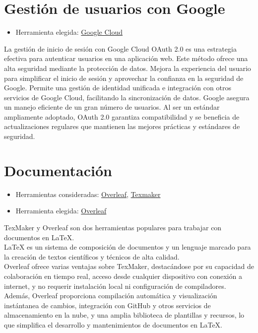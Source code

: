 \section{Gestión de usuarios con Google}
\begin{itemize}
    \item Herramienta elegida: \href{https://cloud.google.com/?_gl=1*1ffy0bq*_up*MQ..&gclid=CjwKCAjwupGyBhBBEiwA0UcqaJ72hmbLebmSBJTVztJdAwkGBs-MRQ33lloMcTTU3bITVG8zzVoTqxoCzYcQAvD_BwE&gclsrc=aw.ds}{Google Cloud}
\end{itemize}
La gestión de inicio de sesión con Google Cloud OAuth 2.0 es una estrategia efectiva para autenticar usuarios en una aplicación web. Este método ofrece una alta seguridad mediante la protección de datos. Mejora la experiencia del usuario para simplificar el inicio de sesión y aprovechar la confianza en la seguridad de Google. Permite una gestión de identidad unificada e integración con otros servicios de Google Cloud, facilitando la sincronización de datos. Google asegura un manejo eficiente de un gran número de usuarios. Al ser un estándar ampliamente adoptado, OAuth 2.0 garantiza compatibilidad y se beneficia de actualizaciones regulares que mantienen las mejores prácticas y estándares de seguridad.

\section{Documentación}
\begin{itemize}
    \item Herramientas consideradas: \href{https://es.overleaf.com/}{Overleaf}, \href{https://www.xm1math.net/texmaker/}{Texmaker}
    \item Herramienta elegida: \href{https://es.overleaf.com/}{Overleaf}
\end{itemize}

TexMaker y Overleaf son dos herramientas populares para trabajar con documentos en LaTeX. \\
LaTeX es un sistema de composición de documentos y un lenguaje marcado para la creación de textos científicos y técnicos de alta calidad. \\

Overleaf ofrece varias ventajas sobre TexMaker, destacándose por su capacidad de colaboración en tiempo real, acceso desde cualquier dispositivo con conexión a internet, y no requerir instalación local ni configuración de compiladores. Además, Overleaf proporciona compilación automática y visualización instántanea de cambios, integración con GitHub y otros servicios de almacenamiento en la nube, y una amplia biblioteca de plantillas y recursos, lo que simplifica el desarrollo y mantenimientos de documentos en LaTeX.

